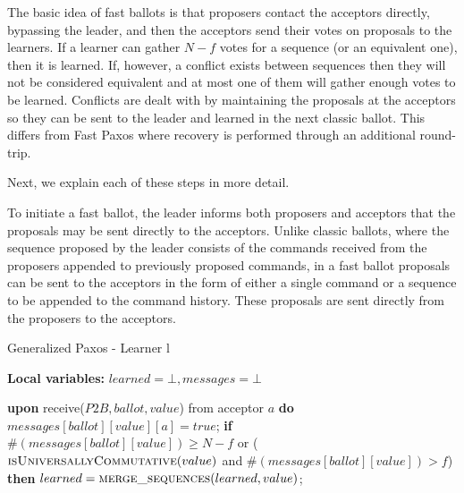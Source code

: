The basic idea of fast ballots is that proposers contact the acceptors directly, bypassing the leader, and then the acceptors send their votes on proposals to the learners. If a learner can gather $N-f$ votes for a sequence (or an equivalent one), then it is learned. If, however, a conflict exists between sequences then they will not be considered equivalent and at most one of them will gather enough votes to be learned. Conflicts are dealt with by maintaining the proposals at the acceptors so they can be sent to the leader and learned in the next classic ballot. This differs from Fast Paxos where recovery is performed through an additional round-trip. \par
Next, we explain each of these steps in more detail.\par
{}
To initiate a fast ballot, the leader informs both proposers and acceptors that the proposals may be sent directly to the acceptors. Unlike classic ballots, where the sequence proposed by the leader consists of the commands received from the proposers appended to previously proposed commands, in a fast ballot proposals can be sent to the acceptors in the form of either a single command or a sequence to be appended to the command history. These proposals are sent directly from the proposers to the acceptors.\par

\begin{algorithm}
	\caption{Generalized Paxos - Learner l}
	\label{CFT-Learn}
	\textbf{Local variables: } $learned = \bot, messages = \bot$ 
	\begin{algorithmic}[1]
		\State \textbf{upon} receive($P2B, ballot, value$) from acceptor $a$ \textbf{do}
		\State \hspace{\algorithmicindent} $messages[ballot][value][a] = true$;
		\State \hspace{\algorithmicindent} \textbf{if} $\#(messages[ballot][value]) \geq N-f$ or ($\Call{isUniversallyCommutative}{value}$ and $\#(messages[ballot][value]) > f$) \textbf{then}
		\State \hspace{\algorithmicindent} \hspace{\algorithmicindent} $learned = \Call{merge\_sequences}{learned, value}$;
	\end{algorithmic}
\end{algorithm}

